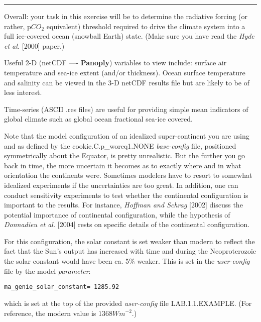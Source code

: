 \vspace{-1mm}\noindent\rule{4cm}{0.5pt}\vspace{2mm}

\noindent Overall: your task in this exercise will be to determine the radiative forcing (or rather, p\(CO_{2}\) equivalent) threshold required to drive the climate system into a full ice-covered ocean (snowball Earth) state. (Make sure you have read the \textit{Hyde et al.} [2000] paper.)

Useful 2-D (netCDF —- \textbf{Panoply}) variables to view include: surface air temperature and sea-ice extent (and/or thickness). Ocean surface temperature and salinity can be viewed in the 3-D netCDF results file but are likely to be of less interest.

Time-series (ASCII \textsf{\footnotesize .res} files) are useful for providing simple mean indicators of global climate such as global ocean fractional sea-ice covered.

Note that the model configuration of an idealized super-continent you are using and as defined by the \textsf{\footnotesize cookie.C.p\_woreq1.NONE} \textit{base-config} file, positioned symmetrically about the Equator, is pretty unrealistic. But the further you go back in time, the more uncertain it becomes as to exactly where and in what orientation the continents were. Sometimes modelers have to resort to somewhat idealized experiments if the uncertainties are too great. In addition, one can conduct sensitivity experiments to test whether the continental configuration is important to the results. For instance, \textit{Hoffman and Schrag} [2002] discuss the potential importance of continental configuration, while the hypothesis of \textit{Donnadieu et al.} [2004] rests on specific details of the continental configuration.

For this configuration, the solar constant is set weaker than modern to reflect the fact that the Sun’s output has increased with time and during the Neoproterozoic the solar constant would have been ca. 5\% weaker. This is set in the \textit{user-config} file by the model \textit{parameter}:

\vspace{-1mm}\small\begin{verbatim}
ma_genie_solar_constant= 1285.92
\end{verbatim}\normalsize\vspace{-1mm}
which is set at the top of the provided \textit{user-config} file \textsf{\footnotesize LAB.1.1.EXAMPLE}. (For reference, the modern value is \( 1368 Wm^{-2}\).)

